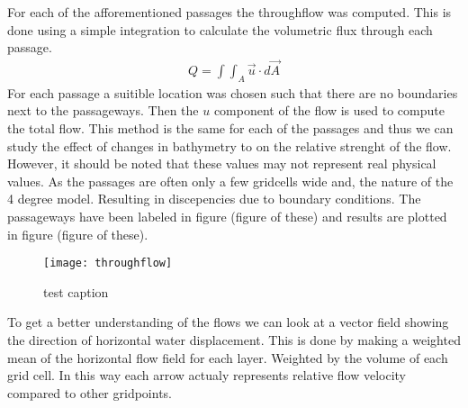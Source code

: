 For each of the afforementioned passages the throughflow was computed. This is done using a simple integration to calculate the volumetric flux through each passage.
\begin{align}
	Q = \int \int_A \vec{u} \cdot d\vec{A}
\end{align}	
For each passage a suitible location was chosen such that there are no boundaries next to the passageways. Then the $u$ component of the flow is used to compute the total flow. This method is the same for each of the passages and thus we can study the effect of changes in bathymetry to on the relative strenght of the flow. However, it should be noted that these values may not represent real physical values. As the passages are often only a few gridcells wide and, the nature of the 4 degree model. Resulting in discepencies due to boundary conditions. The passageways have been labeled in figure (figure of these) and results are plotted in figure (figure of these).

\begin{figure}[H]
	\texttt{[image: throughflow]}
	\caption{test caption}
	\label{fig:throughflow}
\end{figure}

To get a better understanding of the flows we can look at a vector field showing the direction of horizontal water displacement. This is done by making a weighted mean of the horizontal flow field for each layer. Weighted by the volume of each grid cell. In this way each arrow actualy represents relative flow velocity compared to other gridpoints.

